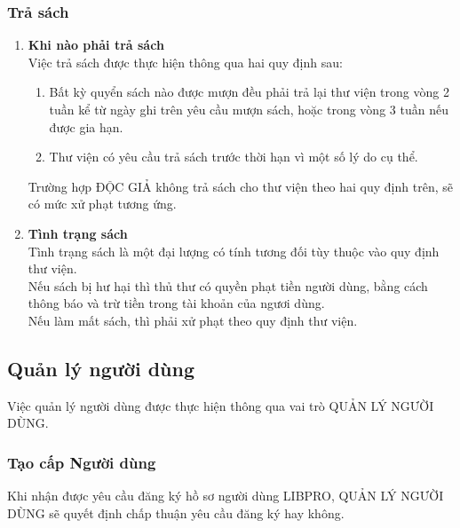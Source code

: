\documentclass[12pt,a4paper]{report}
\begin{document}
            \subsubsection{Trả sách}
                \begin{enumerate}
                \item \textbf{Khi nào phải trả sách}\\
                    Việc trả sách được thực hiện thông qua hai quy định sau:
                    \begin{enumerate}
                        \item Bất kỳ quyển sách nào được mượn đều phải trả lại thư viện trong vòng 2 tuần kể từ ngày ghi trên yêu cầu mượn sách, hoặc trong vòng 3 tuần nếu được gia hạn.\\
                        \item Thư viện có yêu cầu trả sách trước thời hạn vì một số lý do cụ thể.
                    \end{enumerate}
                    Trường hợp ĐỘC GIẢ không trả sách cho thư viện theo hai quy định trên, sẽ có mức xử phạt tương ứng.\\
                \item \textbf{Tình trạng sách}\\
                    Tình trạng sách là một đại lượng có tính tương đối tùy thuộc vào quy định thư viện.\\
                    Nếu sách bị hư hại thì thủ thư có quyền phạt tiền người dùng, bằng cách thông báo và trừ tiền trong tài khoản của ngươi dùng.\\
                    Nếu làm mất sách, thì phải xử phạt theo quy định thư viện.\\
                \end{enumerate}
        \subsection{Quản lý người dùng}
        Việc quản lý người dùng được thực hiện thông qua vai trò QUẢN LÝ NGƯỜI DÙNG.\\
            \subsubsection{Tạo cấp Người dùng}
            Khi nhận được yêu cầu đăng ký hồ sơ người dùng LIBPRO, QUẢN LÝ NGƯỜI DÙNG sẽ quyết định chấp thuận yêu cầu đăng ký hay không.\\
\end{document}
